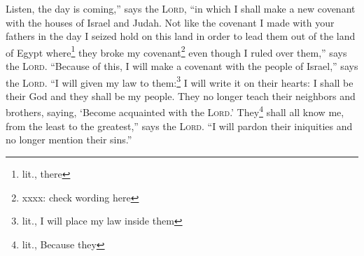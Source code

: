 
\begin{inparaenum}
    
    
    
    
    
    
    
    
     Listen, the day is coming,'' says the \textsc{Lord}, ``in which I shall make a new covenant with the houses of Israel and Judah.%
     Not like the covenant I made with your fathers in the day I seized hold on this land in order to lead them out of the land of Egypt where\footnote{lit., there} they broke my covenant\footnote{xxxx: check wording here} even though I ruled over them,'' says the \textsc{Lord}.%
     ``Because of this, I will make a covenant with the people of Israel,'' says the \textsc{Lord}. ``I will given my law to them:\footnote{lit., I will place my law inside them} I will write it on their hearts: I shall be their God and they shall be my people.%
     They no longer teach their neighbors and brothers, saying, `Become acquainted with the \textsc{Lord}.' They\footnote{lit., Because they} shall all know me, from the least to the greatest,'' says the \textsc{Lord}. ``I will pardon their iniquities and no longer mention their sins.''%
    
    
    
\end{inparaenum}

